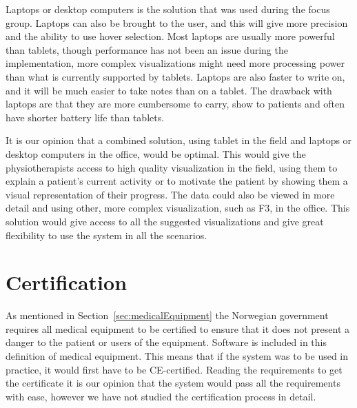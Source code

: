 Laptops or desktop computers is the solution that was used during the focus group. Laptops can also be brought to the user, and this will give more precision and the ability to use hover selection. Most laptops are usually more powerful than tablets, though performance has not been an issue during the implementation, more complex visualizations might need more processing power than what is currently supported by tablets. Laptops are also faster to write on, and it will be much easier to take notes than on a tablet. The drawback with laptops are that they are more cumbersome to carry, show to patients and often have shorter battery life than tablets. 

It is our opinion that a combined solution, using tablet in the field and laptops or desktop computers in the office, would be optimal. This would give the physiotherapists access to high quality visualization in the field, using them to explain a patient's current activity or to motivate the patient by showing them a visual representation of their progress. The data could also be viewed in more detail and using other, more complex visualization, such as F3, in the office. This solution would give access to all the suggested visualizations and give great flexibility to use the system in all the scenarios.

\section{Certification}
As mentioned in Section~\ref{sec:medicalEquipment} the Norwegian government requires all medical equipment to be certified to ensure that it does not present a danger to the patient or users of the equipment. Software is included in this definition of medical equipment. This means that if the system was to be used in practice, it would first have to be CE-certified. Reading the requirements to get the certificate it is our opinion that the system would pass all the requirements with ease, however we have not studied the certification process in detail.
